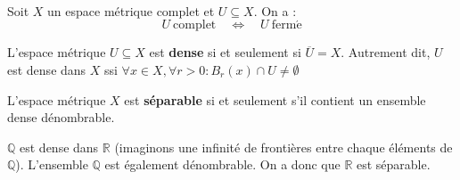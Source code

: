 \noindent
{}\\

\begin{lemme}
    Soit $X$ un espace métrique complet et $U\subseteq X$. On a :
    \begin{equation*}
        U\ \mathrm{complet} \quad\Longleftrightarrow\quad U\ \mathrm{ferm\acute{e}}
    \end{equation*}
\end{lemme}

\begin{definition}
    L'espace métrique $U\subseteq X$ est \textbf{dense} si et seulement si $\overline{U}=X$. Autrement dit, $U$ est dense dans $X$ ssi $\forall x \in X, \forall r>0 : B_r(x) \cap U \neq \emptyset$
\end{definition}

\begin{lemme}
    L'espace métrique $X$ est \textbf{séparable} si et seulement s'il contient un ensemble dense dénombrable.
\end{lemme}

\begin{example}
    $\mathbb{Q}$ est dense dans $\mathbb{R}$ (imaginons une infinité de frontières entre chaque éléments de $\mathbb{Q}$). L'ensemble $\mathbb{Q}$ est également dénombrable. On a donc que $\mathbb{R}$ est séparable.
\end{example}

